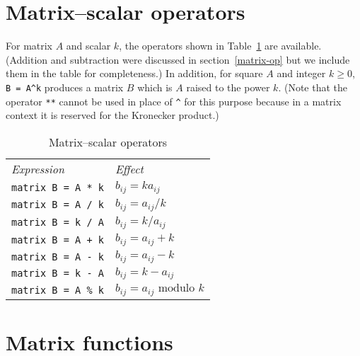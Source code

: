 \section{Matrix--scalar operators}
\label{matrix-scalar-op}

For matrix $A$ and scalar $k$, the operators shown in
Table~\ref{tab:matrix-scalar-ops} are available.  (Addition and
subtraction were discussed in section~\ref{matrix-op} but we include
them in the table for completeness.)  In addition, for square $A$ and
integer $k \geq 0$, \verb|B = A^k| produces a matrix $B$ which is $A$
raised to the power $k$.  (Note that the operator \texttt{**} cannot
be used in place of \verb|^| for this purpose because in a matrix
context it is reserved for the Kronecker product.)

\begin{table}[htbp]
\centering
\begin{tabular}{ll}
\textit{Expression} & \textit{Effect} \\[4pt]
\texttt{matrix B = A * k} & $b_{ij} = k a_{ij}$ \\
\texttt{matrix B = A / k} & $b_{ij} = a_{ij} / k$ \\
\texttt{matrix B = k / A} & $b_{ij} = k / a_{ij}$ \\
\texttt{matrix B = A + k} & $b_{ij} = a_{ij} + k$ \\
\texttt{matrix B = A - k} & $b_{ij} = a_{ij} - k$ \\
\texttt{matrix B = k - A} & $b_{ij} = k - a_{ij}$ \\
\texttt{matrix B = A \% k} & $b_{ij} = a_{ij} \mbox{ modulo } k$ \\
\end{tabular}
\caption{Matrix--scalar operators}
\label{tab:matrix-scalar-ops}
\end{table}


\section{Matrix functions}
\label{matrix-func}

\newlength{\cwid}
\setlength{\cwid}{0.1\textwidth}


